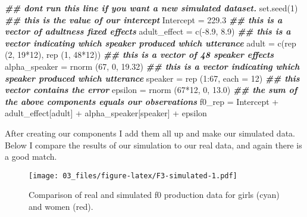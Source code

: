 \documentclass[
]{book}
\newenvironment{Shaded}{\begin{snugshade}}{\end{snugshade}}
\newcommand{\AttributeTok}[1]{\textcolor[rgb]{0.77,0.63,0.00}{#1}}
\newcommand{\DecValTok}[1]{\textcolor[rgb]{0.00,0.00,0.81}{#1}}
\newcommand{\DocumentationTok}[1]{\textcolor[rgb]{0.56,0.35,0.01}{\textbf{\textit{#1}}}}
\newcommand{\FloatTok}[1]{\textcolor[rgb]{0.00,0.00,0.81}{#1}}
\newcommand{\FunctionTok}[1]{\textcolor[rgb]{0.00,0.00,0.00}{#1}}
\newcommand{\NormalTok}[1]{#1}
\newcommand{\OtherTok}[1]{\textcolor[rgb]{0.56,0.35,0.01}{#1}}
\newcommand{\SpecialCharTok}[1]{\textcolor[rgb]{0.00,0.00,0.00}{#1}}
\begin{document}
\begin{Shaded}
\begin{Highlighting}[]
\DocumentationTok{\#\# don\textquotesingle{}t run this line if you want a new simulated dataset. }
\FunctionTok{set.seed}\NormalTok{(}\DecValTok{1}\NormalTok{)}
\DocumentationTok{\#\# this is the value of our intercept}
\NormalTok{Intercept }\OtherTok{=} \FloatTok{229.3}
\DocumentationTok{\#\# this is a vector of adultness fixed effects}
\NormalTok{adult\_effect }\OtherTok{=} \FunctionTok{c}\NormalTok{(}\SpecialCharTok{{-}}\FloatTok{8.9}\NormalTok{, }\FloatTok{8.9}\NormalTok{)}
\DocumentationTok{\#\# this is a vector indicating which speaker produced which utterance}
\NormalTok{adult }\OtherTok{=} \FunctionTok{c}\NormalTok{(}\FunctionTok{rep}\NormalTok{ (}\DecValTok{2}\NormalTok{, }\DecValTok{19}\SpecialCharTok{*}\DecValTok{12}\NormalTok{), }\FunctionTok{rep}\NormalTok{ (}\DecValTok{1}\NormalTok{, }\DecValTok{48}\SpecialCharTok{*}\DecValTok{12}\NormalTok{))}
\DocumentationTok{\#\# this is a vector of 48 speaker effects}
\NormalTok{alpha\_speaker }\OtherTok{=} \FunctionTok{rnorm}\NormalTok{ (}\DecValTok{67}\NormalTok{, }\DecValTok{0}\NormalTok{, }\FloatTok{19.32}\NormalTok{)}
\DocumentationTok{\#\# this is a vector indicating which speaker produced which utterance}
\NormalTok{speaker }\OtherTok{=} \FunctionTok{rep}\NormalTok{ (}\DecValTok{1}\SpecialCharTok{:}\DecValTok{67}\NormalTok{, }\AttributeTok{each =} \DecValTok{12}\NormalTok{)}
\DocumentationTok{\#\# this vector contains the error}
\NormalTok{epsilon }\OtherTok{=} \FunctionTok{rnorm}\NormalTok{ (}\DecValTok{67}\SpecialCharTok{*}\DecValTok{12}\NormalTok{, }\DecValTok{0}\NormalTok{, }\FloatTok{13.0}\NormalTok{)}
\DocumentationTok{\#\# the sum of the above components equals our observations}
\NormalTok{f0\_rep }\OtherTok{=}\NormalTok{ Intercept }\SpecialCharTok{+}\NormalTok{ adult\_effect[adult] }\SpecialCharTok{+}\NormalTok{ alpha\_speaker[speaker] }\SpecialCharTok{+}\NormalTok{ epsilon}
\end{Highlighting}
\end{Shaded}

After creating our components I add them all up and make our simulated data. Below I compare the results of our simulation to our real data, and again there is a good match.

\begin{figure}
\centering
\texttt{[image: 03\_files/figure-latex/F3-simulated-1.pdf]}
\caption{\label{fig:F3-simulated}Comparison of real and simulated f0 production data for girls (cyan) and women (red).}
\end{figure}
\end{document}
